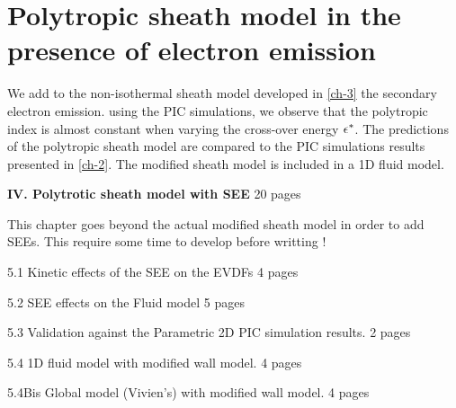 



\chapter{Polytropic sheath model in the presence of electron emission}
\label{ch-4}

\begin{Chabstract}
  
We add to the non-isothermal sheath model developed in \cref{ch-3} the secondary electron emission.
using the \ac{PIC} simulations, we observe that the polytropic index is almost constant when varying the cross-over energy $\epsilon^{*}$.
The predictions of the polytropic sheath model are compared to the \ac{PIC} simulations results presented in \cref{ch-2}.
The modified sheath model is included in a \ac{1D} fluid model.
\end{Chabstract}

{\bf IV. Polytrotic sheath model with SEE} 20 pages
\begin{zzz}
  This chapter goes beyond the actual modified sheath model in order to add SEEs.
  This require some time to develop before writting !

  5.1 Kinetic effects of the SEE on the EVDFs  4 pages

  5.2 SEE effects on the Fluid model  5 pages

  5.3 Validation against the Parametric 2D PIC simulation results. 2 pages
  
  5.4 1D fluid model with modified wall model. 4 pages
  
  5.4Bis Global model (Vivien's) with modified wall model. 4 pages
\end{zzz}

